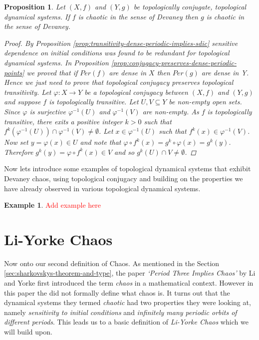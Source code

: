 \documentclass[11pt,a4paper,oneside]{memoir}
\theoremstyle{plain}
\newtheorem{prop}[thm]{Proposition}
\theoremstyle{definition}
\newtheorem{exmp}[thm]{Example}
\begin{document}
\begin{prop}
    Let $(X, f)$ and $(Y, g)$ be topologically conjugate, topological dynamical systems. If $f$ is chaotic in the sense of Devaney then $g$ is chaotic in the sense of Devaney.
    \begin{proof}
        By Proposition \ref{prop:transitivity-dense-periodic-implies-sdic} sensitive dependence on initial conditions was found to be redundant for topological dynamical systems. In Proposition \ref{prop:conjugacy-preserves-dense-periodic-points} we proved that if $Per(f)$ are dense in $X$ then $Per(g)$ are dense in Y. Hence we just need to prove that topological conjugacy preserves topological transitivity. Let $\varphi: X \to Y$ be a topological conjugacy between $(X, f)$ and $(Y, g)$ and suppose $f$ is topologically transitive. Let $U, V \subseteq Y$ be non-empty open sets. Since $\varphi$ is surjective $\varphi^{-1}(U)$ and $\varphi^{-1}(V)$ are non-empty. As $f$ is topologically transitive, there exits a positive integer $k > 0$ such that $f^k(\varphi^{-1}(U)) \cap \varphi^{-1}(V) \neq \emptyset$. Let $x \in \varphi^{-1}(U)$ such that $f^k(x) \in \varphi^{-1}(V)$. Now set $y = \varphi(x) \in U$ and note that $\varphi \circ f^k(x) = g^k \circ \varphi(x) = g^k(y)$. Therefore $g^k(y) = \varphi \circ f^k(x) \in V$ and so $g^k(U) \cap V \neq \emptyset$.
    \end{proof}
\end{prop}

Now lets introduce some examples of topological dynamical systems that exhibit Devaney chaos, using topological conjugacy and building on the properties we have already observed in various topological dynamical systems.

\begin{exmp}
    \textcolor{red}{Add example here}
\end{exmp}

\section{Li-Yorke Chaos} \label{sec:li-yorke-chaos}

Now onto our second definition of Chaos. As mentioned in the Section \ref{sec:sharkovskys-theorem-and-type}, the paper \emph{`Period Three Implies Chaos'} by Li and Yorke \cite{li-yorke} first introduced the term \emph{chaos} in a mathematical context. However in this paper the did not formally define what chaos is. It turns out that the dynamical systems they termed \emph{chaotic} had two properties they were looking at, namely \emph{sensitivity to initial conditions} and \emph{infinitely many periodic orbits of different periods}. This leads us to a basic definition of \emph{Li-Yorke Chaos} which we will build upon.
\end{document}

